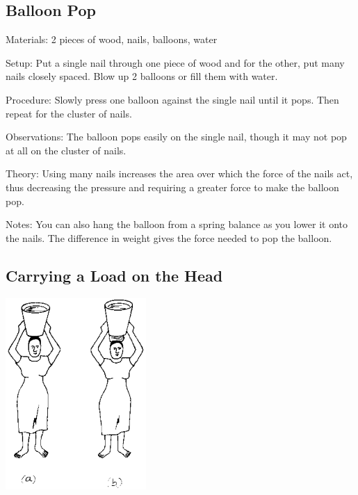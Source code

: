 \begin{multicols}{2}
\subsection{Balloon Pop}


\begin{description*}
\item[Materials:]{2 pieces of wood, nails, balloons, water}
\item[Setup:]{Put a single nail through one piece of wood and for the other, put many nails closely spaced. Blow up 2 balloons or fill them with water.}
\item[Procedure:]{Slowly press one balloon against the single nail until it pops. Then repeat for the cluster of nails.}
\item[Observations:]{The balloon pops easily on the single nail, though it may not pop at all on the cluster of nails.}
\item[Theory:]{Using many nails increases the area over which the force of the nails act, thus decreasing the pressure and requiring a greater force to make the balloon pop.}
\item[Notes:]{You can also hang the balloon from a spring balance as you lower it onto the nails. The difference in weight gives the force needed to pop the balloon.}
\end{description*}

\columnbreak

\subsection{Carrying a Load on the Head}

\begin{center}
\includegraphics[width=0.4\textwidth]{./img/source/load-head.png}
\end{center}


\end{multicols}
